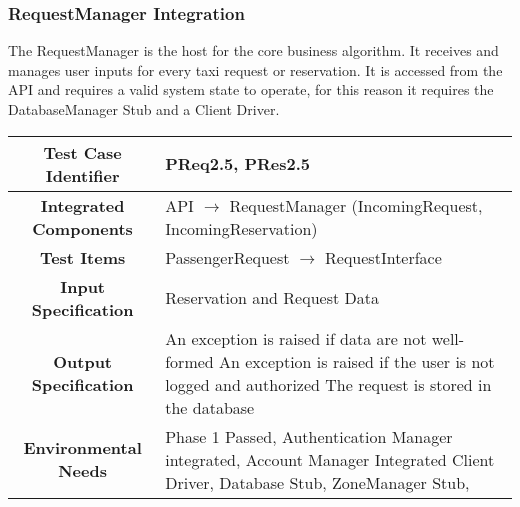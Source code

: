 \documentclass[11pt, a4paper,titlepage]{article}
\begin{document}
	 \subsubsection{RequestManager Integration}
	 The RequestManager is the host for the core business algorithm. It receives and manages user inputs for every taxi request or reservation. It is accessed from the API and requires a valid system state to operate, for this reason it requires the DatabaseManager Stub and a Client Driver. 
	  
	 	\begin{tabularx}{\textwidth}{| c|X|}
	 		\hline \textbf{Test Case Identifier} & \label{PReq2.5}PReq2.5, \label{PRes2.5}PRes2.5 \\
	 		\hline \textbf{Integrated Components} & API  $\rightarrow $ RequestManager (IncomingRequest, IncomingReservation) \\
	 		\hline \textbf{Test Items} & PassengerRequest $\rightarrow $ RequestInterface \\
	 		\hline \textbf{Input Specification} & Reservation and Request Data \\
	 		\hline \textbf{Output Specification} & An exception is raised if data are not well-formed \newline
												   An exception is raised if the user is not logged and authorized \newline
												   The request is stored in the database\\
	 		\hline \textbf{Environmental Needs} &  Phase 1 Passed, Authentication Manager integrated, Account Manager Integrated \newline 
	 		Client Driver, Database Stub, ZoneManager Stub,\\
	 		\hline
	 	\end{tabularx}
	 	\newline
\end{document}
